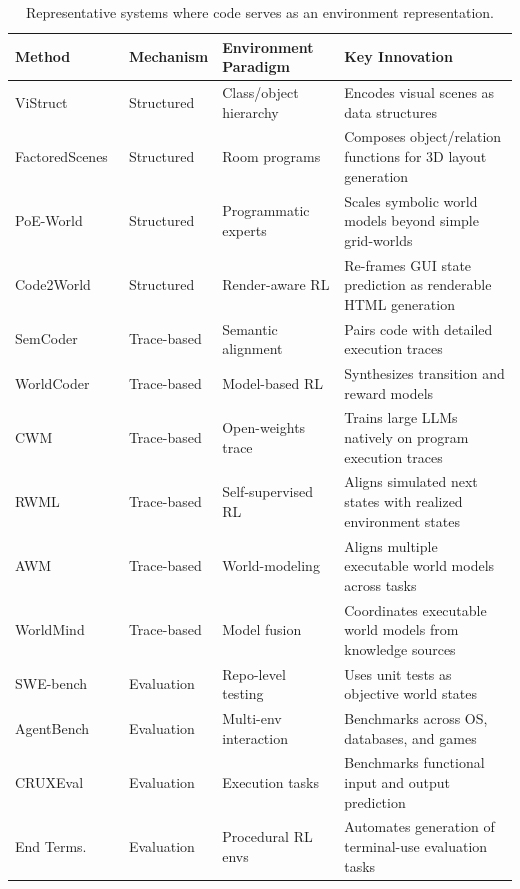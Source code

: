 \begin{table}[t]
\centering
\caption{Representative systems where code serves as an environment representation.}
\renewcommand{\arraystretch}{1.15}
\setlength{\tabcolsep}{4pt}
\footnotesize
\begin{tabularx}{\textwidth}{p{2.8cm}p{2.0cm}p{3.1cm}X}
\toprule
\textbf{Method} & \textbf{Mechanism} & \textbf{Environment Paradigm} & \textbf{Key Innovation} \\
\midrule
ViStruct~\cite{chen2023vistruct} & Structured & Class/object hierarchy & Encodes visual scenes as data structures \\
FactoredScenes~\cite{hsu2025programs} & Structured & Room programs & Composes object/relation functions for 3D layout generation \\
PoE-World~\cite{piriyakulkij2025poe} & Structured & Programmatic experts & Scales symbolic world models beyond simple grid-worlds \\
Code2World~\cite{zheng2026code2world} & Structured & Render-aware RL & Re-frames GUI state prediction as renderable HTML generation \\
SemCoder~\cite{ding2024semcoder} & Trace-based & Semantic alignment & Pairs code with detailed execution traces \\
WorldCoder~\cite{tang2024worldcoder} & Trace-based & Model-based RL & Synthesizes transition and reward models \\
CWM~\cite{copet2025cwm} & Trace-based & Open-weights trace & Trains large LLMs natively on program execution traces \\
RWML~\cite{yu2026reinforcement} & Trace-based & Self-supervised RL & Aligns simulated next states with realized environment states \\
AWM~\cite{wang2026agent} & Trace-based & World-modeling & Aligns multiple executable world models across tasks \\
WorldMind~\cite{ren2026aligning} & Trace-based & Model fusion & Coordinates executable world models from knowledge sources \\
SWE-bench~\cite{jimenez2023swe} & Evaluation & Repo-level testing & Uses unit tests as objective world states \\
AgentBench~\cite{liu2023agentbench} & Evaluation & Multi-env interaction & Benchmarks across OS, databases, and games \\
CRUXEval~\cite{gu2024cruxeval} & Evaluation & Execution tasks & Benchmarks functional input and output prediction \\
End Terms.~\cite{gandhi2026endless} & Evaluation & Procedural RL envs & Automates generation of terminal-use evaluation tasks \\

\end{tabularx}
\end{table}

